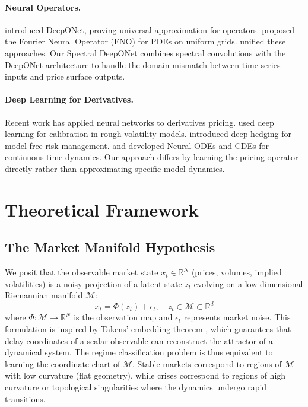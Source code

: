 \documentclass{article}
\begin{document}
\paragraph{Neural Operators.}
\citet{Lu_2021} introduced DeepONet, proving universal approximation for operators. \citet{li2020fourier} proposed the Fourier Neural Operator (FNO) for PDEs on uniform grids. \citet{kovachki2021neuraloperator} unified these approaches. Our Spectral DeepONet combines spectral convolutions with the DeepONet architecture to handle the domain mismatch between time series inputs and price surface outputs.

\paragraph{Deep Learning for Derivatives.}
Recent work has applied neural networks to derivatives pricing. \citet{horvath2021deep} used deep learning for calibration in rough volatility models. \citet{buehler2019deep} introduced deep hedging for model-free risk management. \citet{chen2018neural} and \citet{kidger2020neural} developed Neural ODEs and CDEs for continuous-time dynamics. Our approach differs by learning the pricing operator directly rather than approximating specific model dynamics.

\section{Theoretical Framework}

\subsection{The Market Manifold Hypothesis}
We posit that the observable market state \(x_t \in \mathbb{R}^N\) (prices, volumes, implied volatilities) is a noisy projection of a latent state \(z_t\) evolving on a low-dimensional Riemannian manifold \(\mathcal{M}\):
\[
    x_t = \Phi(z_t) + \epsilon_t, \quad z_t \in \mathcal{M} \subset \mathbb{R}^d
\]
where \(\Phi: \mathcal{M} \to \mathbb{R}^N\) is the observation map and \(\epsilon_t\) represents market noise. This formulation is inspired by Takens' embedding theorem \citep{takens1981detecting}, which guarantees that delay coordinates of a scalar observable can reconstruct the attractor of a dynamical system. The regime classification problem is thus equivalent to learning the coordinate chart of \(\mathcal{M}\). Stable markets correspond to regions of \(\mathcal{M}\) with low curvature (flat geometry), while crises correspond to regions of high curvature or topological singularities where the dynamics undergo rapid transitions.
\end{document}
